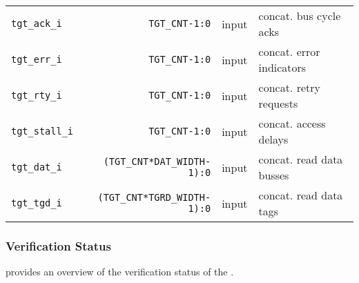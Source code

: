 \begin{center}
\begin{longtable}{|l|r|l|l|}
    \texttt{tgt\_ack\_i}         & \texttt{TGT\_CNT-1:0}               & input  & concat. bus cycle acks              \\*
    \texttt{tgt\_err\_i}         & \texttt{TGT\_CNT-1:0}               & input  & concat. error indicators	      \\*
    \texttt{tgt\_rty\_i}         & \texttt{TGT\_CNT-1:0}               & input  & concat. retry requests	      \\*
    \texttt{tgt\_stall\_i}       & \texttt{TGT\_CNT-1:0}               & input  & concat. access delays	              \\*
    \texttt{tgt\_dat\_i}         & \texttt{(TGT\_CNT*DAT\_WIDTH-1):0}  & input  & concat. read data busses	      \\*
    \texttt{tgt\_tgd\_i}         & \texttt{(TGT\_CNT*TGRD\_WIDTH-1):0} & input  & concat. read data tags              \\   
  \end{longtable}
\end{center}  
\endgroup

\pagebreak

\subsubsection{Verification Status}
\label{xbar:verif}

 provides an overview of the verification status of the .

